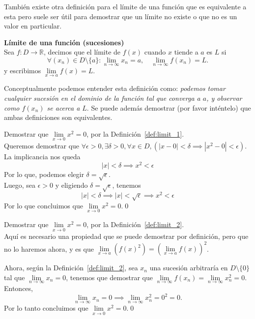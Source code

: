 \documentclass[12pt]{book}
\begin{document}
También existe otra definición para el límite de una función que es equivalente a esta pero suele ser útil para demostrar que un límite no existe o que no es un valor en particular.

\begin{definitionenv}\label{def:limit_2}
    \textbf{Límite de una función (sucesiones)}\\
    Sea $f:D\to \mathbb{R}$, decimos que el límite de $f(x)$ cuando $x$ tiende a $a$ es $L$ si
    \[
        \forall (x_n)\in D\setminus \{a\}: \lim\limits_{n\to \infty}x_n=a, \quad\lim\limits_{n\to\infty}f(x_n)=L.
    \]
    y escribimos $\lim\limits_{x\to a}f(x)=L$.
\end{definitionenv}

Conceptualmente podemos entender esta definición como: \textit{podemos tomar cualquier sucesión en el dominio de la función tal que converga a $a$, y observar como $f(x_n)$ se acerca a $L$}. Se puede además demostrar (por favor inténtelo) que ambas definiciones son equivalentes.

\begin{exampleenv}
    Demostrar que $\lim\limits_{x\to 0} x^2=0$, por la Definición~\ref{def:limit_1}.\\
    Queremos demostrar que $\forall \epsilon>0,\exists\delta>0,\forall x\in D, (|x-0|<\delta\implies |x^2-0|<\epsilon).$
    La implicancia nos queda
    \[
    |x|<\delta\implies x^2<\epsilon
    \]
    Por lo que, podemos elegir $\delta = \sqrt{\epsilon}$.\\

    Luego, sea $\epsilon>0$ y eligiendo $\delta=\sqrt{\epsilon}$, tenemos
    \[
    |x|<\delta\implies|x|<\sqrt{\epsilon}\implies x^2<\epsilon
    \]
    Por lo que concluimos que $\lim\limits_{x\to0}x^2=0.$\qed
\end{exampleenv}

\begin{exampleenv}
    Demostrar que $\lim\limits_{x\to 0} x^2=0$, por la Definición~\ref{def:limit_2}.\\

    Aquí es necesario una propiedad que se puede demostrar por definición, pero que no lo haremos ahora, y es que $\lim\limits_{x\to a} (f(x)^2)=(\lim\limits_{x\to a} f(x))^2$.

    Ahora, según la Definición~\ref{def:limit_2}, sea $x_n$ una sucesión arbitraría en $D\setminus \{0\}$ tal que $\lim\limits_{n\to\infty}x_n=0$, tenemos que demostrar que $\lim\limits_{n\to\infty}f(x_n)=\lim\limits_{n\to\infty}x_n^2=0$. Entonces,
    \[
    \lim\limits_{n\to\infty}x_n=0\implies \lim\limits_{n\to\infty}x_n^2=0^2=0.
    \]
    Por lo tanto concluimos que $\lim\limits_{x\to 0} x^2=0$.\qed
\end{exampleenv}
\end{document}
